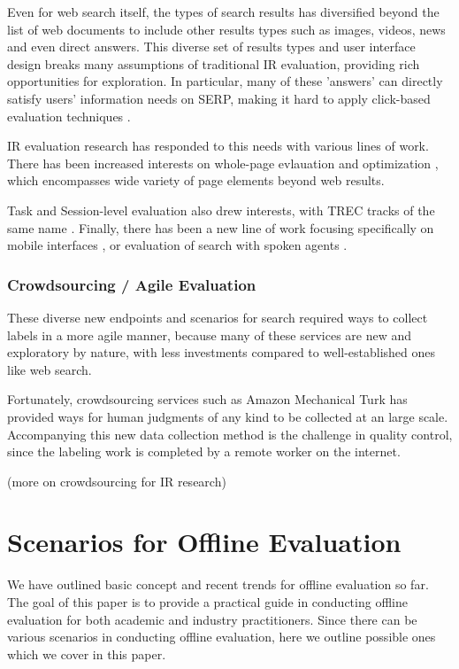 \documentclass[openany]{now} %
\begin{document}
Even for web search itself, the types of search results has diversified beyond the list of web documents to include other results types such as images, videos, news and even direct answers. This diverse set of results types and user interface design breaks many assumptions of traditional IR evaluation, providing rich opportunities for exploration. In particular, many of these 'answers' can directly satisfy users' information needs on SERP, making it hard to apply click-based evaluation techniques \cite{Li2009GA} \cite{diriye2012leaving}.

IR evaluation research has responded to this needs with various lines of work. There has been increased interests on whole-page evlauation and optimization \cite{Zhou:2012}, which encompasses wide variety of page elements beyond web results. %

Task and Session-level evaluation \cite{KanoulasCCS11, CarteretteKHC14} also drew interests, with TREC tracks of the same name \cite{}. Finally, there has been a new line of work focusing specifically on mobile interfaces \cite{VermaYC16}, or evaluation of search with spoken agents \cite{Kiseleva:2016}.

\subsubsection{Crowdsourcing / Agile Evaluation}

These diverse new endpoints and scenarios for search required ways to collect labels in a more agile manner, because many of these services are new and exploratory by nature, with less investments compared to well-established ones like web search.

Fortunately, crowdsourcing services such as Amazon Mechanical Turk has provided ways for human judgments of any kind to be collected at an large scale. Accompanying this new data collection method is the challenge in quality control, since the labeling work is completed by a remote worker on the internet.

(more on crowdsourcing for IR research)

\section{Scenarios for Offline Evaluation}

We have outlined basic concept and recent trends for offline evaluation so far. The goal of this paper is to provide a practical guide in conducting offline evaluation for both academic and industry practitioners. Since there can be various scenarios in conducting offline evaluation, here we outline possible ones which we cover in this paper.
\end{document}

